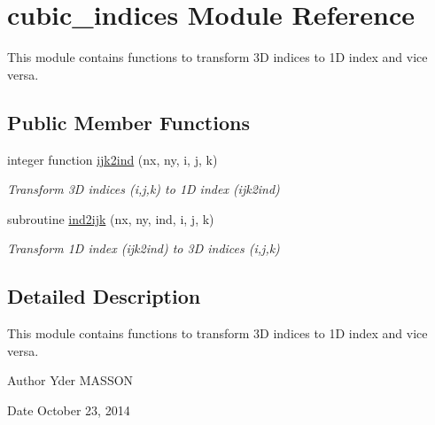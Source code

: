\hypertarget{classcubic__indices}{
\section{cubic\-\_\-indices \-Module \-Reference}
\label{classcubic__indices}
}


\-This module contains functions to transform 3\-D indices to 1\-D index and vice versa.  


\subsection*{\-Public \-Member \-Functions}
\begin{DoxyCompactItemize}
\item 
integer function \hyperlink{classcubic__indices_a35837621e5ea30874caaafd29294cd5c}{ijk2ind} (nx, ny, i, j, k)
\begin{DoxyCompactList}\small\item\em \-Transform 3\-D indices (i,j,k) to 1\-D index (ijk2ind) \end{DoxyCompactList}\item 
subroutine \hyperlink{classcubic__indices_a5835060055b1ba7d8786dab7b9c333bc}{ind2ijk} (nx, ny, ind, i, j, k)
\begin{DoxyCompactList}\small\item\em \-Transform 1\-D index (ijk2ind) to 3\-D indices (i,j,k) \end{DoxyCompactList}\end{DoxyCompactItemize}


\subsection{\-Detailed \-Description}
\-This module contains functions to transform 3\-D indices to 1\-D index and vice versa. 

\begin{DoxyAuthor}{\-Author}
\-Yder \-M\-A\-S\-S\-O\-N 
\end{DoxyAuthor}
\begin{DoxyDate}{\-Date}
\-October 23, 2014 
\end{DoxyDate}



